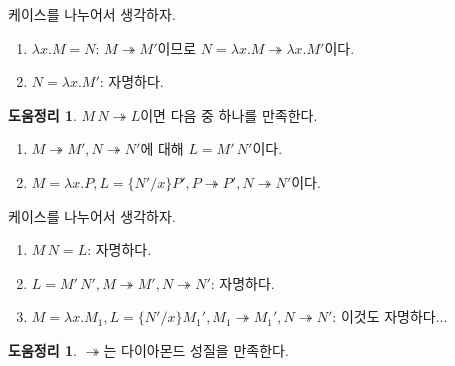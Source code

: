 \documentclass[b5paper, 11pt]{book}
\theoremstyle{definition}
\newtheorem{lem}[defn]{도움정리}
\newenvironment{pf*}{\pushQED{\qed}\pf}
{\popQED\endpf}
\begin{document}
\begin{pf*}
    케이스를 나누어서 생각하자.
    \begin{enumerate}
        \item $\lambda x. M = N$: $M \twoheadrightarrow M'$이므로 $N = \lambda x .M
        \twoheadrightarrow \lambda x. M'$이다.
        \item $N = \lambda x . M'$: 자명하다.
    \end{enumerate}
\end{pf*}
\begin{lem} \label{application lemma}
    $M \, N \twoheadrightarrow L$이면 다음 중 하나를 만족한다.
    \begin{enumerate}
        \item $M \twoheadrightarrow M', N \twoheadrightarrow N'$에 대해 $L = M' \, N'$이다.
        \item $M = \lambda x. P, L = \{N' / x\} P', P \twoheadrightarrow P', 
        N \twoheadrightarrow N'$이다.
    \end{enumerate}
\end{lem}
\begin{pf*}
    케이스를 나누어서 생각하자.
    \begin{enumerate}
        \item $M\, N = L$:
        자명하다. 
        \item $L = M' \, N' , M \twoheadrightarrow M', N \twoheadrightarrow N'$:
        자명하다.
        \item $M = \lambda x. M_1 ,L = \{N'/x\} M_1', M_1 \twoheadrightarrow M_1',
        N \twoheadrightarrow N'$:
        이것도 자명하다...
    \end{enumerate}
\end{pf*}
\begin{lem} \label{twohead diamond}
    $\twoheadrightarrow$는 다이아몬드 성질을 만족한다.
\end{lem}
\end{document}

